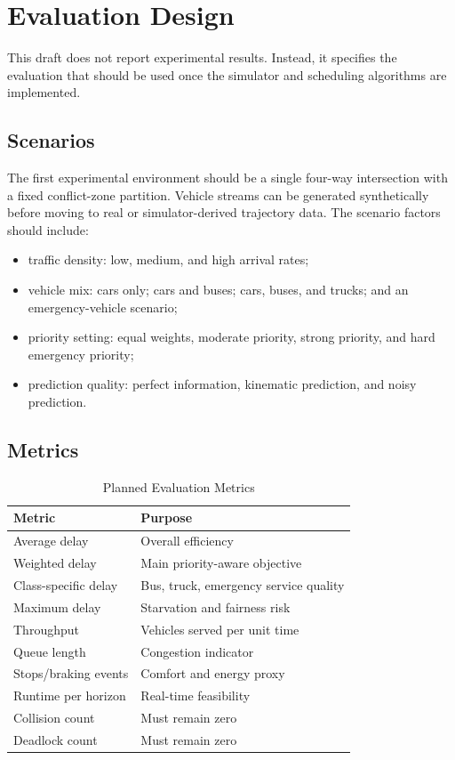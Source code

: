 \section{Evaluation Design}

This draft does not report experimental results. Instead, it specifies the evaluation that should be used once the simulator and scheduling algorithms are implemented.

\subsection{Scenarios}

The first experimental environment should be a single four-way intersection with a fixed conflict-zone partition. Vehicle streams can be generated synthetically before moving to real or simulator-derived trajectory data. The scenario factors should include:
\begin{itemize}
    \item traffic density: low, medium, and high arrival rates;
    \item vehicle mix: cars only; cars and buses; cars, buses, and trucks; and an emergency-vehicle scenario;
    \item priority setting: equal weights, moderate priority, strong priority, and hard emergency priority;
    \item prediction quality: perfect information, kinematic prediction, and noisy prediction.
\end{itemize}

\subsection{Metrics}

\begin{table}[t]
\centering
\caption{Planned Evaluation Metrics}
\label{tab:metrics}
\begin{tabular}{ll}
\toprule
Metric & Purpose \\
\midrule
Average delay & Overall efficiency \\
Weighted delay & Main priority-aware objective \\
Class-specific delay & Bus, truck, emergency service quality \\
Maximum delay & Starvation and fairness risk \\
Throughput & Vehicles served per unit time \\
Queue length & Congestion indicator \\
Stops/braking events & Comfort and energy proxy \\
Runtime per horizon & Real-time feasibility \\
Collision count & Must remain zero \\
Deadlock count & Must remain zero \\
\bottomrule
\end{tabular}
\end{table}

